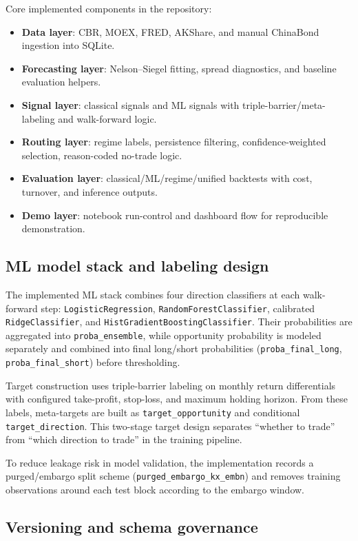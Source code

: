 \documentclass[a4paper,12pt]{extarticle}
\begin{document}
Core implemented components in the repository:
\begin{itemize}
\item \textbf{Data layer}: CBR, MOEX, FRED, AKShare, and manual ChinaBond ingestion into SQLite.
\item \textbf{Forecasting layer}: Nelson--Siegel fitting, spread diagnostics, and baseline evaluation helpers.
\item \textbf{Signal layer}: classical signals and ML signals with triple-barrier/meta-labeling and walk-forward logic.
\item \textbf{Routing layer}: regime labels, persistence filtering, confidence-weighted selection, reason-coded no-trade logic.
\item \textbf{Evaluation layer}: classical/ML/regime/unified backtests with cost, turnover, and inference outputs.
\item \textbf{Demo layer}: notebook run-control and dashboard flow for reproducible demonstration.
\end{itemize}

\subsection{ML model stack and labeling design}

The implemented ML stack combines four direction classifiers at each walk-forward step: \texttt{LogisticRegression}, \texttt{RandomForestClassifier}, calibrated \texttt{RidgeClassifier}, and \texttt{HistGradientBoostingClassifier}. Their probabilities are aggregated into \texttt{proba\_ensemble}, while opportunity probability is modeled separately and combined into final long/short probabilities (\texttt{proba\_final\_long}, \texttt{proba\_final\_short}) before thresholding.

Target construction uses triple-barrier labeling on monthly return differentials with configured take-profit, stop-loss, and maximum holding horizon. From these labels, meta-targets are built as \texttt{target\_opportunity} and conditional \texttt{target\_direction}. This two-stage target design separates ``whether to trade'' from ``which direction to trade'' in the training pipeline.

To reduce leakage risk in model validation, the implementation records a purged/embargo split scheme (\texttt{purged\_embargo\_kx\_embn}) and removes training observations around each test block according to the embargo window.

\subsection{Versioning and schema governance}
\end{document}
